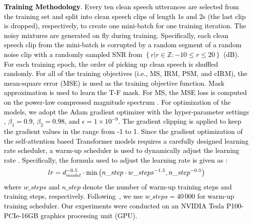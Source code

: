\documentclass[journal]{IEEEtran}
\begin{document}
\textcolor{black}{\textbf{Training Methodology}. Every ten clean speech utterances are selected from the training set and split into clean speech clips of length 1s and 2s (the last clip is dropped), respectively, to create one mini-batch for one training iteration. The noisy mixtures are generated on fly during training. Specifically, each clean speech clip from the mini-batch is corrupted by a random segment of a random noise clip with a randomly sampled SNR from $\left\{r|r\in \mathbb{Z}: -10 \leq r \leq 20 \right\}$ (dB). For each training epoch, the order of picking up clean speech is shuffled randomly. 
For all of the training objectives (i.e., MS, IRM, PSM, \textcolor{black}{and cIRM}), the mean-square error (MSE) is used as the training objective function. Mask approximation is used to learn the T-F mask. For MS, the MSE loss is computed on the power-law compressed magnitude spectrum \cite{2021interactive}. For optimization of the models, we adopt the Adam gradient optimizer with the hyper-parameter settings \cite{attention2017}, $\beta_{1}\!=\!0.9$, $\beta_{2}\!=\!0.98$, and $\epsilon\!=\!1\times10^{-9}$. The gradient clipping is applied to keep the gradient values in the range from -1 to 1. Since the gradient optimization of the self-attention based Transformer models requires a carefully designed learning rate scheduler, a warm-up scheduler is used to dynamically adjust the learning rate \cite{mhanet,attention2017}. Specifically, the formula used to adjust the learning rate is given as \cite{tfaj}:
\begin{equation}
\vspace{-0.2em}
    lr = d_{model}^{-0.5}\cdot \textrm{min} \left(n\_step \cdot w\_steps^{-1.5}, n\_step^{-0.5}\right)
\end{equation}
where $w\_steps$ and $n\_step$ denote the number of warm-up training steps and training steps, respectively. Following~\cite{mhanet}, we use $w\_steps\!=\!40\,000$ for warm-up training scheduler. Our experiments were conducted on an NVIDIA Tesla P100-PCIe-16GB graphics processing unit (GPU).}


\end{document}
